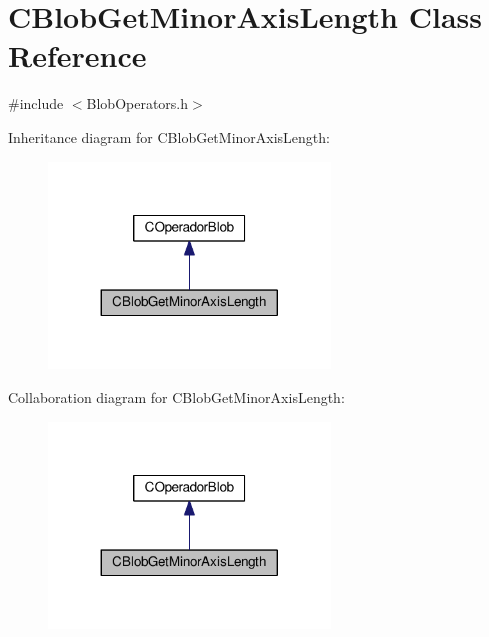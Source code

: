 \hypertarget{classCBlobGetMinorAxisLength}{\section{C\-Blob\-Get\-Minor\-Axis\-Length Class Reference}
\label{classCBlobGetMinorAxisLength}
}


{\ttfamily \#include $<$Blob\-Operators.\-h$>$}



Inheritance diagram for C\-Blob\-Get\-Minor\-Axis\-Length\-:\nopagebreak
\begin{figure}[H]
\begin{center}
\leavevmode
\includegraphics[width=212pt]{classCBlobGetMinorAxisLength__inherit__graph}
\end{center}
\end{figure}


Collaboration diagram for C\-Blob\-Get\-Minor\-Axis\-Length\-:\nopagebreak
\begin{figure}[H]
\begin{center}
\leavevmode
\includegraphics[width=212pt]{classCBlobGetMinorAxisLength__coll__graph}
\end{center}
\end{figure}
